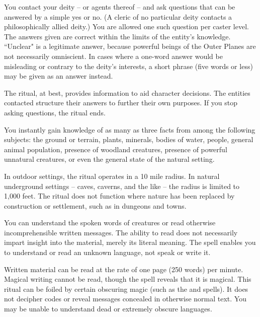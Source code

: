\spelldur{\durmed}
\spelleffect You contact your deity -- or agents thereof -- and ask questions that can be answered by a simple yes or no. (A cleric of no particular deity contacts a philosophically allied deity.) You are allowed one such question per caster level. The answers given are correct within the limits of the entity's knowledge. ``Unclear" is a legitimate answer, because powerful beings of the Outer Planes are not necessarily omniscient. In cases where a one-word answer would be misleading or contrary to the deity's interests, a short phrase (five words or less) may be given as an answer instead.
\par The ritual, at best, provides information to aid character decisions. The entities contacted structure their answers to further their own purposes. If you stop asking questions, the ritual ends.

\spelleffect You instantly gain knowledge of as many as three facts from among the following subjects: the ground or terrain, plants, minerals, bodies of water, people, general animal population, presence of woodland creatures, presence of powerful unnatural creatures, or even the general state of the natural setting.
\par In outdoor settings, the ritual operates in a 10 mile radius. In natural underground settings -- caves, caverns, and the like -- the radius is limited to 1,000 feet. The ritual does not function where nature has been replaced by construction or settlement, such as in dungeons and towns.

\spelldur{\durlong}
\spelleffect You can understand the spoken words of creatures or read otherwise incomprehensible written messages. The ability to read does not necessarily impart insight into the material, merely its literal meaning. The spell enables you to understand or read an unknown language, not speak or write it.
\par Written material can be read at the rate of one page (250 words) per minute. Magical writing cannot be read, though the spell reveals that it is magical. 
\spellnotes This ritual can be foiled by certain obscuring magic (such as the  and  spells). It does not decipher codes or reveal messages concealed in otherwise normal text. You may be unable to understand dead or extremely obscure languages.

